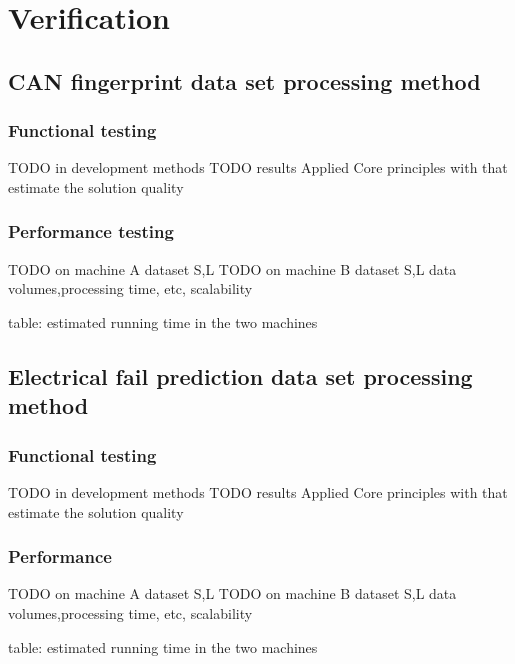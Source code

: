 \chapter{Verification}
\section{CAN fingerprint data set processing method}
\subsection{Functional testing}
TODO in development methods
TODO results
Applied Core principles with that estimate the solution quality
\subsection{Performance testing}
TODO on machine A dataset S,L
TODO on machine B dataset S,L
	data volumes,processing time, etc, scalability

table: estimated running time in the two machines
\section{Electrical fail prediction data set processing method}
\subsection{Functional testing}
TODO in development methods
TODO results
Applied Core principles with that estimate the solution quality
\subsection{Performance}
TODO on machine A dataset S,L
TODO on machine B dataset S,L
	data volumes,processing time, etc, scalability

table: estimated running time in the two machines